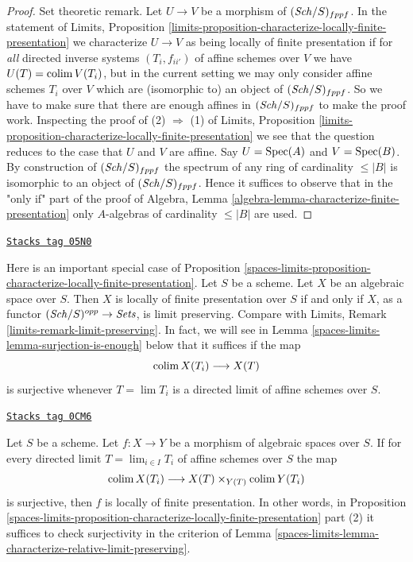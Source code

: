 \begin{proof}
\medskip\noindent
Set theoretic remark. Let $U \to V$ be a morphism of
$(\mathit{Sch}/S)_{fppf}$. In the statement of
Limits, Proposition
\ref{limits-proposition-characterize-locally-finite-presentation}
we characterize $U \to V$ as being locally of finite presentation
if for {\it all} directed inverse systems $(T_i, f_{ii'})$ of affine schemes
over $V$ we have $U(T) = \operatorname{colim} V(T_i)$, but in the current setting
we may only consider affine schemes $T_i$ over $V$ which are (isomorphic to)
an object of $(\mathit{Sch}/S)_{fppf}$. So we have to make sure that there
are enough affines in $(\mathit{Sch}/S)_{fppf}$ to make the proof work.
Inspecting the proof of (2) $\Rightarrow$ (1) of
Limits, Proposition
\ref{limits-proposition-characterize-locally-finite-presentation}
we see that the question reduces to the case that $U$ and $V$ are affine.
Say $U = \operatorname{Spec}(A)$ and $V = \operatorname{Spec}(B)$. By construction
of $(\mathit{Sch}/S)_{fppf}$ the spectrum of any ring of cardinality
$\leq |B|$ is isomorphic to an object of $(\mathit{Sch}/S)_{fppf}$.
Hence it suffices to observe that in the "only if" part of the proof of
Algebra, Lemma \ref{algebra-lemma-characterize-finite-presentation}
only $A$-algebras of cardinality $\leq |B|$ are used.
\end{proof}

\begin{remark}
\label{spaces-limits-remark-limit-preserving}
\href{https://stacks.math.columbia.edu/tag/05N0}{\texttt{Stacks tag 05N0}}

Here is an important special case of
Proposition \ref{spaces-limits-proposition-characterize-locally-finite-presentation}.
Let $S$ be a scheme. Let $X$ be an algebraic space over $S$.
Then $X$ is locally of finite presentation over $S$ if and only
if $X$, as a functor $(\mathit{Sch}/S)^{opp} \to \textit{Sets}$,
is limit preserving. Compare with
Limits, Remark \ref{limits-remark-limit-preserving}.
In fact, we will see in Lemma \ref{spaces-limits-lemma-surjection-is-enough}
below that it suffices if the map
$$
\operatorname{colim} X(T_i) \longrightarrow X(T)
$$
is surjective whenever $T = \lim T_i$ is a directed limit of
affine schemes over $S$.
\end{remark}

\begin{lemma}
\label{spaces-limits-lemma-surjection-is-enough}
\href{https://stacks.math.columbia.edu/tag/0CM6}{\texttt{Stacks tag 0CM6}}

Let $S$ be a scheme.
Let $f : X \to Y$ be a morphism of algebraic spaces over $S$.
If for every directed limit $T = \lim_{i \in I} T_i$
of affine schemes over $S$ the map
$$
\operatorname{colim} X(T_i) \longrightarrow X(T) \times_{Y(T)} \operatorname{colim} Y(T_i)
$$
is surjective, then $f$ is locally of finite presentation.
In other words, in
Proposition \ref{spaces-limits-proposition-characterize-locally-finite-presentation}
part (2) it suffices to check surjectivity in the criterion of
Lemma \ref{spaces-limits-lemma-characterize-relative-limit-preserving}.
\end{lemma}

